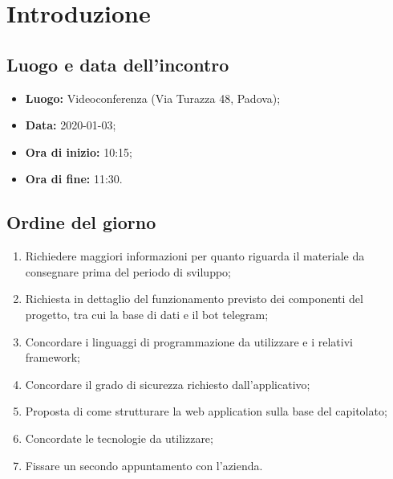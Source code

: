 \section*{Introduzione}

\subsection*{Luogo e data dell'incontro}
	\begin{itemize}
		\item \textbf{Luogo:} Videoconferenza (Via Turazza 48, Padova);
		\item \textbf{Data:} 2020-01-03;
		\item \textbf{Ora di inizio:} 10:15;
		\item \textbf{Ora di fine:} 11:30.
	\end{itemize}

\subsection*{Ordine del giorno}
	\begin{enumerate}
		\item Richiedere maggiori informazioni per quanto riguarda il materiale da consegnare prima del periodo di sviluppo;
		\item Richiesta in dettaglio del funzionamento previsto dei componenti del progetto, tra cui la base di dati e il bot telegram;
		\item Concordare i linguaggi di programmazione da utilizzare e i relativi framework;
		\item Concordare il grado di sicurezza richiesto dall'applicativo;
		\item Proposta di come strutturare la web application sulla base del capitolato;
		\item Concordate le tecnologie da utilizzare;
		\item Fissare un secondo appuntamento con l'azienda.
	\end{enumerate}

